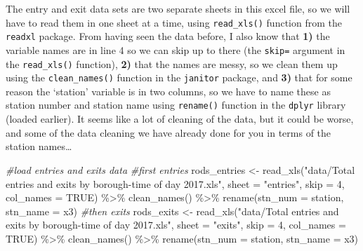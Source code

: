\documentclass[
  krantz2]{krantz}
\makeatletter
\newenvironment{Shaded}{\begin{snugshade}}{\end{snugshade}}
\newcommand{\AttributeTok}[1]{\textcolor[rgb]{0.61,0.61,0.61}{#1}}
\newcommand{\CommentTok}[1]{\textcolor[rgb]{0.37,0.37,0.37}{\textit{#1}}}
\newcommand{\ConstantTok}[1]{\textcolor[rgb]{0,0,0}{#1}}
\newcommand{\DecValTok}[1]{\textcolor[rgb]{0.06,0.06,0.06}{#1}}
\newcommand{\FunctionTok}[1]{\textcolor[rgb]{0,0,0}{#1}}
\newcommand{\NormalTok}[1]{#1}
\newcommand{\OtherTok}[1]{\textcolor[rgb]{0.37,0.37,0.37}{#1}}
\newcommand{\SpecialCharTok}[1]{\textcolor[rgb]{0,0,0}{#1}}
\newcommand{\StringTok}[1]{\textcolor[rgb]{0.5,0.5,0.5}{#1}}
\newenvironment{kframe}{%
\medskip{}
\setlength{\fboxsep}{.8em}
 \def\at@end@of@kframe{}%
 \ifinner\ifhmode%
  \def\at@end@of@kframe{\end{minipage}}%
  \begin{minipage}{\columnwidth}%
 \fi\fi%
 \def\FrameCommand##1{\hskip\@totalleftmargin \hskip-\fboxsep
 \colorbox{shadecolor}{##1}\hskip-\fboxsep
     \hskip-\linewidth \hskip-\@totalleftmargin \hskip\columnwidth}%
 \MakeFramed {\advance\hsize-\width
   \@totalleftmargin\z@ \linewidth\hsize
   \@setminipage}}%
 {\par\unskip\endMakeFramed%
 \at@end@of@kframe}
\renewenvironment{Shaded}{\begin{kframe}}{\end{kframe}}
\makeatother
\begin{document}
The entry and exit data sets are two separate sheets in this excel file, so we will have to read them in one sheet at a time, using \texttt{read\_xls()} function from the \texttt{readxl} package. From having seen the data before, I also know that \textbf{1)} the variable names are in line 4 so we can skip up to there (the \texttt{skip=} argument in the \texttt{read\_xls()} function), \textbf{2) }that the names are messy, so we clean them up using the \texttt{clean\_names()} function in the \texttt{janitor} package, and \textbf{3)} that for some reason the `station' variable is in two columns, so we have to name these as station number and station name using \texttt{rename()} function in the \texttt{dplyr} library (loaded earlier). It seems like a lot of cleaning of the data, but it could be worse, and some of the data cleaning we have already done for you in terms of the station names\ldots{}

\begin{Shaded}
\begin{Highlighting}[]
\CommentTok{\#load entries and exits data}
\CommentTok{\#first entries}
\NormalTok{rods\_entries }\OtherTok{\textless{}{-}} \FunctionTok{read\_xls}\NormalTok{(}\StringTok{"data/Total entries and exits by borough{-}time of day 2017.xls"}\NormalTok{, }\AttributeTok{sheet =} \StringTok{"entries"}\NormalTok{,}
                 \AttributeTok{skip =} \DecValTok{4}\NormalTok{, }\AttributeTok{col\_names =} \ConstantTok{TRUE}\NormalTok{) }\SpecialCharTok{\%\textgreater{}\%} \FunctionTok{clean\_names}\NormalTok{() }\SpecialCharTok{\%\textgreater{}\%} \FunctionTok{rename}\NormalTok{(}\AttributeTok{stn\_num =}\NormalTok{ station, }
                                                                          \AttributeTok{stn\_name =}\NormalTok{ x3)}
\CommentTok{\#then exits}
\NormalTok{rods\_exits }\OtherTok{\textless{}{-}} \FunctionTok{read\_xls}\NormalTok{(}\StringTok{"data/Total entries and exits by borough{-}time of day 2017.xls"}\NormalTok{, }\AttributeTok{sheet =} \StringTok{"exits"}\NormalTok{,}
                         \AttributeTok{skip =} \DecValTok{4}\NormalTok{, }\AttributeTok{col\_names =} \ConstantTok{TRUE}\NormalTok{) }\SpecialCharTok{\%\textgreater{}\%} \FunctionTok{clean\_names}\NormalTok{() }\SpecialCharTok{\%\textgreater{}\%} \FunctionTok{rename}\NormalTok{(}\AttributeTok{stn\_num =}\NormalTok{ station, }
                                                                              \AttributeTok{stn\_name =}\NormalTok{ x3)}
\end{Highlighting}
\end{Shaded}
\end{document}
